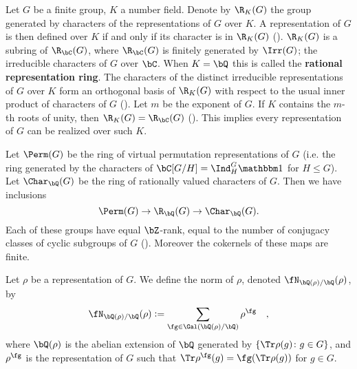 Let $G$ be a finite group, $K$ a number field.
Denote by $\R_K(G)$ the group generated by characters of the representations of $G$ over $K$. A representation of $G$ is then defined over $K$ if and only if its character is in $\R_K(G)$ (\cite[Proposition 33]{Serre}).
$\R_K(G)$ is a subring of $\R_{\bC}(G)$, where $\R_{\bC}(G)$ is finitely generated by $\Irr(G)$; the irreducible characters of $G$ over $\bC$.
When $K = \bQ$ this is called the \textbf{rational representation ring}.
The characters of the distinct irreducible representations of $G$ over $K$ form an orthogonal basis of $\R_K(G)$ with respect to the usual inner product of characters of $G$ (\cite[Proposition 32]{Serre}).
Let $m$ be the exponent of $G$. If $K$ contains the $m$-th roots of unity, then $\R_K(G) = \R_{\bC}(G)$ (\cite[Theorem 24]{Serre}). This implies every representation of $G$ can be realized over such $K$. 
\vspace{1em}

Let $\Perm(G)$ be the ring of virtual permutation representations of $G$ (i.e. the ring generated by the characters of $\bC[G / H] = \Ind_{H}^G \trivial$ for $H \leq G$). Let $\Char_{\bQ}(G)$ be the ring of rationally valued characters of $G$. Then we have inclusions 
\[ \Perm(G) \to \R_{\bQ}(G) \to \Char_{\bQ}(G). \]
Each of these groups have equal $\bZ$-rank, equal to the number of conjugacy classes of cyclic subgroups of $G$ (\cite[Chapter 13, \S13.1]{Serre}). Moreover the cokernels of these maps are finite.

\begin{defn}\label{rho-norm}
    Let $\rho$ be a representation of $G$. We define the norm of $\rho$, denoted $\repnorm{\rho}$, by 
    \[
    \repnorm{\rho} \defeq \sum_{\fg \in \Gal(\bQ(\rho)/\bQ)}  \rho^\fg \quad,
    \]
    where $\bQ(\rho)$ is the abelian extension of $\bQ$ generated by $\{ \Tr \rho(g) \colon g \in G \}$, and $\rho^\fg$ is the representation of $G$ such that $\Tr \rho^{\fg}(g) = \fg(\Tr \rho(g))$ for $g \in G$. 
\end{defn}

